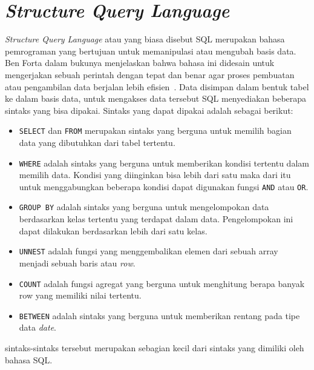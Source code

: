 \section{\textit{Structure Query Language}~\cite{book:SQLBigQuery}}
\label{sec:sql}
\textit{Structure Query Language} atau yang biasa disebut SQL merupakan bahasa pemrograman yang bertujuan untuk memanipulasi atau mengubah basis data. Ben Forta dalam bukunya menjelaskan bahwa bahasa ini didesain untuk mengerjakan sebuah perintah dengan tepat dan benar agar proses pembuatan atau pengambilan data berjalan lebih efisien~\cite{ben}. Data disimpan dalam bentuk tabel ke dalam basis data, untuk mengakses data tersebut SQL menyediakan beberapa sintaks yang bisa dipakai. Sintaks yang dapat dipakai adalah sebagai berikut:
\begin{itemize}
    \item \verb|SELECT| dan \verb|FROM| merupakan sintaks yang berguna untuk memilih bagian data yang dibutuhkan dari tabel tertentu.
    \item \verb|WHERE| adalah sintaks yang berguna untuk memberikan kondisi tertentu dalam memilih data. Kondisi yang diinginkan bisa lebih dari satu maka dari itu untuk menggabungkan beberapa kondisi dapat digunakan fungsi \verb|AND| atau \verb|OR|.
    \item \verb|GROUP BY| adalah sintaks yang berguna untuk mengelompokan data berdasarkan kelas tertentu yang terdapat dalam data. Pengelompokan ini dapat dilakukan berdasarkan lebih dari satu kelas.
    \item \verb|UNNEST| adalah fungsi yang menggembalikan elemen dari sebuah array menjadi sebuah baris atau \textit{row}.
    \item \verb|COUNT| adalah fungsi agregat yang berguna untuk menghitung berapa banyak row yang memiliki nilai tertentu.
    \item \verb|BETWEEN| adalah sintaks yang berguna untuk memberikan rentang pada tipe data \textit{date}.
\end{itemize}
sintaks-sintaks tersebut merupakan sebagian kecil dari sintaks yang dimiliki oleh bahasa SQL.



